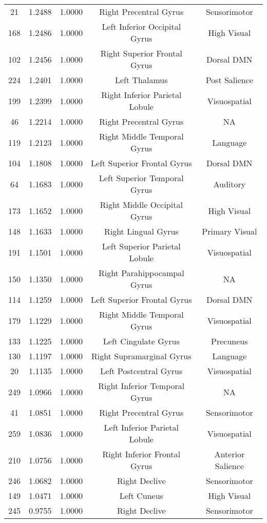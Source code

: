 \documentclass[10pt,letterpaper]{article}\usepackage[]{graphicx}\usepackage[]{color}
\begin{document}
\begin{center}
\begin{longtable}[c]{ccccc}
	21	& 1.2488 & 1.0000 & Right Precentral Gyrus & Sensorimotor \\
	168	& 1.2486 & 1.0000 & Left Inferior Occipital Gyrus & High Visual \\
	102	& 1.2456 & 1.0000 & Right Superior Frontal Gyrus & Dorsal DMN \\
	224	& 1.2401 & 1.0000 & Left Thalamus & Post Salience \\
	199	& 1.2399 & 1.0000 & Right Inferior Parietal Lobule & Visuospatial \\
	46	& 1.2214 & 1.0000 & Right Precentral Gyrus & NA \\
	119	& 1.2123 & 1.0000 & Right Middle Temporal Gyrus & Language \\
	104	& 1.1808 & 1.0000 & Left Superior Frontal Gyrus & Dorsal DMN \\
	64	& 1.1683 & 1.0000 & Left Superior Temporal Gyrus & Auditory \\
	173	& 1.1652 & 1.0000 & Right Middle Occipital Gyrus & High Visual \\
	148	& 1.1633 & 1.0000 & Right Lingual Gyrus & Primary Visual \\
	191	& 1.1501 & 1.0000 & Left Superior Parietal Lobule & Visuospatial \\
	150	& 1.1350 & 1.0000 & Right Parahippocampal Gyrus & NA \\
	114	& 1.1259 & 1.0000 & Left Superior Frontal Gyrus & Dorsal DMN \\
	179	& 1.1229 & 1.0000 & Right Middle Temporal Gyrus & Visuospatial \\
	133	& 1.1225 & 1.0000 & Left Cingulate Gyrus & Precuneus \\
	130	& 1.1197 & 1.0000 & Right Supramarginal Gyrus & Language \\
	20	& 1.1135 & 1.0000 & Left Postcentral Gyrus & Visuospatial \\
	249	& 1.0966 & 1.0000 & Right Inferior Temporal Gyrus & NA \\
	41	& 1.0851 & 1.0000 & Right Precentral Gyrus & Sensorimotor \\
	259	& 1.0836 & 1.0000 & Left Inferior Parietal Lobule & Visuospatial \\
	210	& 1.0756 & 1.0000 & Right Inferior Frontal Gyrus & Anterior Salience \\
	246	& 1.0682 & 1.0000 & Right Declive & Sensorimotor \\
	149	& 1.0471 & 1.0000 & Left Cuneus & High Visual \\
	245	& 0.9755 & 1.0000 & Right Declive & Sensorimotor \\

\end{longtable}
\end{center}
\end{document}
